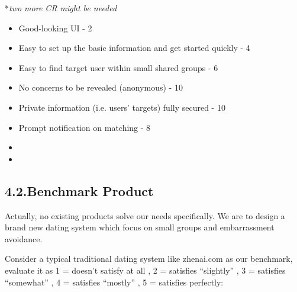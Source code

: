\documentclass{article}
\begin{document}
\noindent{}*\emph{two more CR might be needed}%

\begin{itemize}[noitemsep,topsep=\mdcompacttopsep]%

\item{}Good-looking UI - 2%

\item{}Easy to set up the basic information and get started quickly - 4%

\item{}Easy to find target user within small shared groups - 6%

\item{}No concerns to be revealed (anonymous) - 10%

\item{}Private information (i.e. users' targets) fully secured - 10%

\item{}Prompt notification on matching - 8%

\item%

\item%
\end{itemize}%

\subsection{4.2.\hspace*{0.5em}Benchmark Product}\label{sec-benchmark-product}%

\noindent{}Actually, no existing products solve our needs specifically. We are to design a brand new dating system which focus on small groups and embarrassment avoidance.%

Consider a typical traditional dating system like zhenai.com as our benchmark, evaluate it as 1 = doesn’t satisfy at all
, 2 = satisfies “slightly”
, 3 = satisfies “somewhat”
, 4 = satisfies “mostly”
, 5 = satisfies perfectly:%
\end{document}

